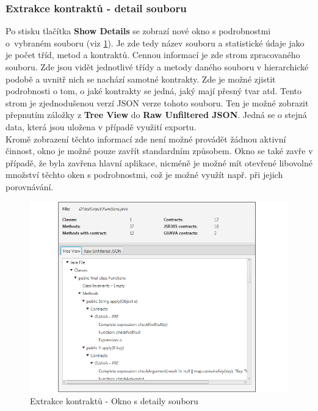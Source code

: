 			\subsubsection{Extrakce kontraktů - detail souboru}
				Po stisku tlačítka \textbf{Show Details} se zobrazí nové okno s podrobnostmi o~vybraném souboru (viz \ref{guide05}). Je zde tedy název souboru a statistické údaje jako je počet tříd, metod a kontraktů. Cennou informací je zde strom zpracovaného souboru. Zde jsou vidět jednotlivé třídy a metody daného souboru v hierarchické podobě a uvnitř nich se nachází samotné kontrakty. Zde je možné zjistit podrobnosti o tom, o jaké kontrakty se jedná, jaký mají přesný tvar atd. Tento strom je zjednodušenou verzí JSON verze tohoto souboru. Ten je možné zobrazit přepnutím záložky z \textbf{Tree View} do \textbf{Raw Unfiltered JSON}. Jedná se o stejná data, která jsou uložena v případě využití exportu.\\
				
				Kromě zobrazení těchto informací zde není možné provádět žádnou aktivní činnost, okno je možné pouze zavřít standardním způsobem. Okno se také zavře v případě, že byla zavřena hlavní aplikace, nicméně je možné mít otevřené libovolné množství těchto oken s podrobnostmi, což je možné využít např. při jejich porovnávání.
				
			\begin{figure}[!htb]
					\centering
					\includegraphics[width=1\textwidth]{img/guide05.png}
					\caption[guide05]{Extrakce kontraktů - Okno s detaily souboru}
					\label{guide05}
				\endminipage\hfill
			\end{figure}
			
